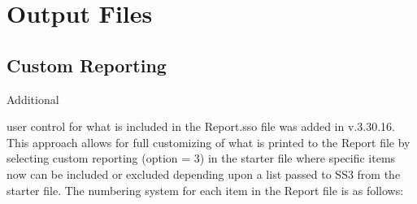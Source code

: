 \section{Output Files}

\subsection{Custom Reporting}
\hypertarget{custom}{Additional} user control for what is included in the Report.sso file was added in v.3.30.16. This approach allows for full customizing of what is printed to the Report file by selecting custom reporting (option = 3) in the starter file where specific items now can be included or excluded depending upon a list passed to SS3 from the starter file. The numbering system for each item in the Report file is as follows:

